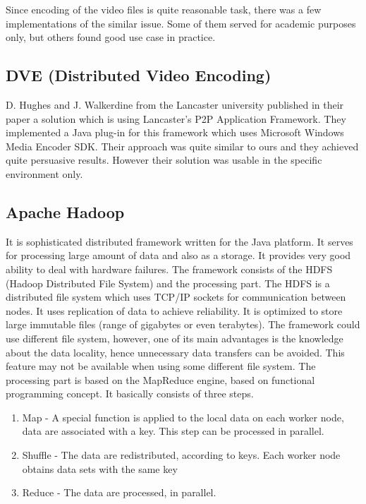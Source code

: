 Since encoding of the video files is quite reasonable task, there was a
few implementations of the similar issue. Some of them served for
academic purposes only, but others found good use case in practice.

\subsection{DVE (Distributed Video
Encoding)}\label{dve-distributed-video-encoding}

D. Hughes and J. Walkerdine from the Lancaster university published in
their paper a solution which is using Lancaster's P2P Application
Framework. They implemented a Java plug-in for this framework which uses
Microsoft Windows Media Encoder SDK. Their approach was quite similar to
ours and they achieved quite persuasive results. However their solution
was usable in the specific environment only.\citep{DVE}

\subsection{Apache Hadoop}\label{apache-hadoop}

It is sophisticated distributed framework written for the Java platform.
It serves for processing large amount of data and also as a storage. It
provides very good ability to deal with hardware failures. The framework
consists of the HDFS (Hadoop Distributed File System) and the processing
part. The HDFS is a distributed file system which uses TCP/IP sockets
for communication between nodes. It uses replication of data to achieve
reliability. It is optimized to store large immutable files (range of
gigabytes or even terabytes). The framework could use different file
system, however, one of its main advantages is the knowledge about the
data locality, hence unnecessary data transfers can be avoided. This
feature may not be available when using some different file system. The
processing part is based on the MapReduce engine, based on functional
programming concept. It basically consists of three steps.

\begin{enumerate}
\item Map - A special function is applied to the local data on each worker node, data are associated with a key. This step can be processed in parallel.
\item Shuffle - The data are redistributed, according to keys. Each worker node obtains data sets with the same key
\item Reduce - The data are processed, in parallel.
\end{enumerate}

